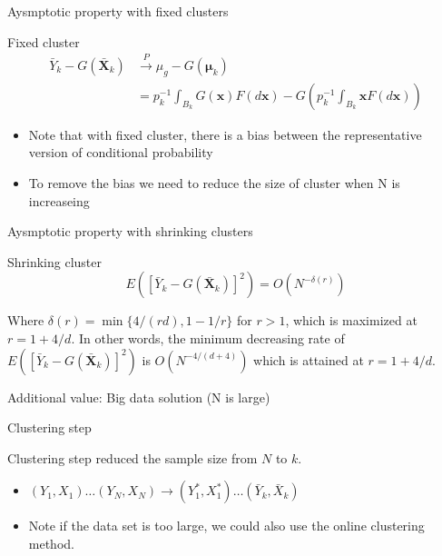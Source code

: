 \documentclass[ignorenonframetext,]{beamer}
\providecommand{\tightlist}{%
  \setlength{\itemsep}{0pt}\setlength{\parskip}{0pt}}
\begin{document}
\begin{frame}{Aysmptotic property with fixed clusters}

\begin{block}{Fixed cluster}
\begin{align*}
\bar{Y}_k - G(\bar{\mathbf X}_k) &\stackrel{P}{\longrightarrow} \mu_g - G(\boldsymbol{\mu}_k)\\
& = p_k^{-1} \int_{B_k} G({\mathbf x}) F(d{\mathbf x}) - G\left(p_k^{-1} \int_{B_k} {\mathbf x} F(d{\mathbf x})\right)
\end{align*}
\end{block}

\begin{itemize}
\tightlist
\item
  Note that with fixed cluster, there is a bias between the
  representative version of conditional probability
\item
  To remove the bias we need to reduce the size of cluster when N is
  increaseing
\end{itemize}

\end{frame}

\begin{frame}{Aysmptotic property with shrinking clusters}

\begin{block}{Shrinking cluster}
\[
E([\bar{Y}_k - G(\bar{\mathbf X}_k)]^2) = O(N^{-\delta(r)})
\]
\end{block}

Where \(\delta(r) = \min\{4/(rd), 1-1/r\}\) for \(r>1\), which is
maximized at \(r = 1 + 4/d\). In other words, the minimum decreasing
rate of \(E([\bar{Y}_k - G(\bar{\mathbf X}_k)]^2)\) is
\(O(N^{-4/(d+4)})\) which is attained at \(r= 1 + 4/d\).

\end{frame}

\begin{frame}{Additional value: Big data solution (N is large)}

\begin{block}{Clustering step}

Clustering step reduced the sample size from \(N\) to \(k\).

\begin{itemize}
\item
  \((Y_1,X_1) \dots (Y_N,X_N) \to (Y^*_{1},X^*_{1}) \dots (\bar{Y}_k,\bar{X}_k)\)
\item
  Note if the data set is too large, we could also use the online
  clustering method.
\end{itemize}

\end{block}

\end{frame}
\end{document}
